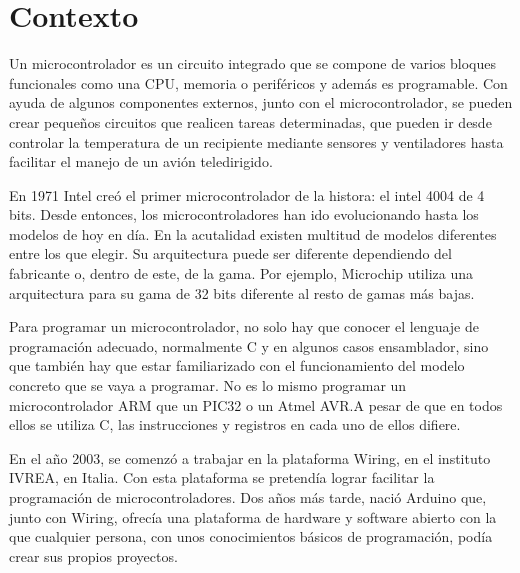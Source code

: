 

\section{Contexto} %
%
\label{sec:Contexto}
Un microcontrolador es un circuito integrado que se compone de varios bloques funcionales como una CPU, memoria o periféricos y además es programable. Con ayuda de algunos componentes externos, junto con el microcontrolador, se pueden crear pequeños circuitos que realicen tareas determinadas, que pueden ir desde controlar la temperatura de un recipiente mediante sensores y ventiladores hasta facilitar el manejo de un avión teledirigido.

En 1971 Intel creó el primer microcontrolador de la histora: el intel 4004 de 4 bits. Desde entonces, los microcontroladores han ido evolucionando hasta los modelos de hoy en día. En la acutalidad existen multitud de modelos diferentes entre los que elegir. Su arquitectura puede ser diferente dependiendo del fabricante o, dentro de este, de la gama. Por ejemplo, Microchip utiliza una arquitectura para su gama de 32 bits diferente al resto de gamas más bajas.

Para programar un microcontrolador, no solo hay que conocer el lenguaje de programación adecuado, normalmente C y en algunos casos ensamblador, sino que también hay que estar familiarizado con el funcionamiento del modelo concreto que se vaya a programar. No es lo mismo programar un microcontrolador ARM que un PIC32 o un Atmel AVR.\@ A pesar de que en todos ellos se utiliza C, las instrucciones y registros en cada uno de ellos difiere.

En el año 2003, se comenzó a trabajar en la plataforma Wiring, en el instituto IVREA, en Italia. Con esta plataforma se pretendía lograr facilitar la programación de microcontroladores. Dos años más tarde, nació Arduino que, junto con Wiring, ofrecía una plataforma de hardware y software abierto con la que cualquier persona, con unos conocimientos básicos de programación, podía crear sus propios proyectos.

